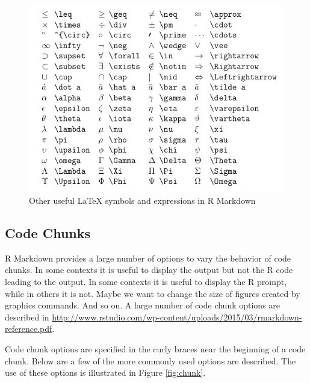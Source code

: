 \documentclass[]{krantz}
\theoremstyle{definition}
\theoremstyle{definition}
\theoremstyle{definition}
\theoremstyle{remark}
\begin{document}
\begin{figure}

{\centering \includegraphics[width=1\linewidth]{03-scripts/03-images/latex} 

}

\caption{Other useful LaTeX symbols and expressions in R Markdown}\label{fig:latex}
\end{figure}

\subsection{Code Chunks}\label{code-chunks}

R Markdown provides a large number of options to vary the behavior of
code chunks. In some contexts it is useful to display the output but not
the R code leading to the output. In some contexts it is useful to
display the R prompt, while in others it is not. Maybe we want to change
the size of figures created by graphics commands. And so on. A large
number of code chunk options are described in
\url{http://www.rstudio.com/wp-content/uploads/2015/03/rmarkdown-reference.pdf}.

Code chunk options are specified in the curly braces near the beginning
of a code chunk. Below are a few of the more commonly used options are
described. The use of these options is illustrated in Figure
\ref{fig:chunk}.
\end{document}

